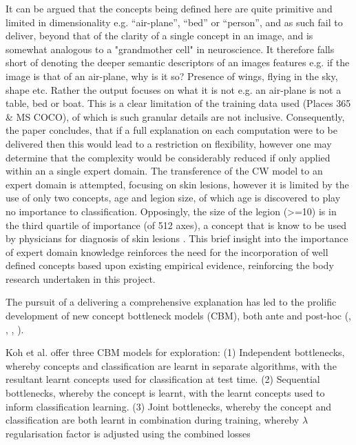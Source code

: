 It can be argued that the concepts being defined here are quite primitive and limited in dimensionality e.g. “air-plane”, “bed” or “person”, and as such fail to deliver, beyond that of the clarity of a single concept in an image, and is somewhat analogous to a "grandmother cell" in neuroscience. It therefore falls short of denoting the deeper semantic descriptors of an images features e.g. if the image is that of an  air-plane, why is it so? Presence of wings, flying in the sky, shape etc. Rather the output focuses on what it is not e.g. an air-plane is not a table, bed or boat. This is a clear limitation of the training data used (Places 365 \& MS COCO), of which is such granular details are not inclusive. Consequently, the paper concludes, that if a full explanation on each computation were to be delivered then this would lead to a restriction on flexibility, however one may determine that the complexity would be considerably reduced if only applied within an a single expert domain. The transference of the CW model to an expert domain is attempted, focusing on skin lesions, however it is limited by the use of only two concepts, age and legion size, of which age is discovered to play no importance to classification. Opposingly, the size of the legion (>=10) is in the third quartile of importance (of 512 axes), a concept that is know to be used by physicians for diagnosis of skin lesions \cite{walterUsing7pointChecklist2013}. This brief insight into the importance of expert domain knowledge reinforces the need for the incorporation of well defined concepts based upon existing empirical evidence, reinforcing the body research undertaken in this project.

The pursuit of a delivering a comprehensive explanation has led to the prolific development of new concept bottleneck models (CBM), both ante and post-hoc (\cite{kohConceptBottleneckModels2020}, \cite{margeloiuConceptBottleneckModels2021}, \cite{havasiAddressingLeakageConcept2022a}, \cite{yuksekgonulPosthocConceptBottleneck2022}). 

Koh et al. \cite{kohConceptBottleneckModels2020} offer three CBM models for exploration: 
(1)	Independent bottlenecks, whereby concepts and classification are learnt in separate algorithms, with the resultant learnt concepts used for classification at test time.
(2)	Sequential bottlenecks, whereby the concept is learnt, with the learnt concepts used to inform classification learning.
(3)	Joint bottlenecks, whereby the concept and classification are both learnt in combination during training, whereby $\lambda$ regularisation factor is adjusted using the combined losses  

